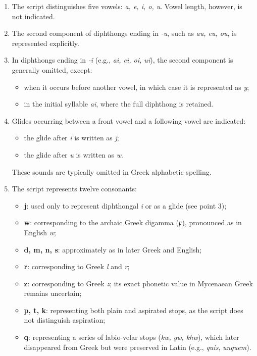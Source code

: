 \begin{enumerate}
\item The script distinguishes five vowels: \textit{a, e, i, o, u}. Vowel length, however, is not indicated.

\item The second component of diphthongs ending in \textit{-u}, such as \textit{au, eu, ou}, is represented explicitly.

\item In diphthongs ending in \textit{-i} (e.g., \textit{ai, ei, oi, ui}), the second component is generally omitted, except:
\begin{itemize}
    \item when it occurs before another vowel, in which case it is represented as \textit{y};
    \item in the initial syllable \textit{ai}, where the full diphthong is retained.
\end{itemize}

\item Glides occurring between a front vowel and a following vowel are indicated:
\begin{itemize}
    \item the glide after \textit{i} is written as \textit{j};
    \item the glide after \textit{u} is written as \textit{w}.
\end{itemize}
These sounds are typically omitted in Greek alphabetic spelling.

\item The script represents twelve consonants:
\begin{itemize}
    \item \textbf{j}: used only to represent diphthongal \textit{i} or as a glide (see point 3);
    \item \textbf{w}: corresponding to the archaic Greek digamma (\textit{\textgreek{ϝ}}), pronounced as in English \textit{w};
    \item \textbf{d, m, n, s}: approximately as in later Greek and English;
    \item \textbf{r}: corresponding to Greek \textit{l} and \textit{r};
    \item \textbf{z}: corresponding to Greek \textit{z}; its exact phonetic value in Mycenaean Greek remains uncertain;
    \item \textbf{p, t, k}: representing both plain and aspirated stops, as the script does not distinguish aspiration;
    \item \textbf{q}: representing a series of labio-velar stops (\textit{kw, gw, khw}), which later disappeared from Greek but were preserved in Latin (e.g., \textit{quis}, \textit{unguem}).
\end{itemize}


\end{enumerate}
